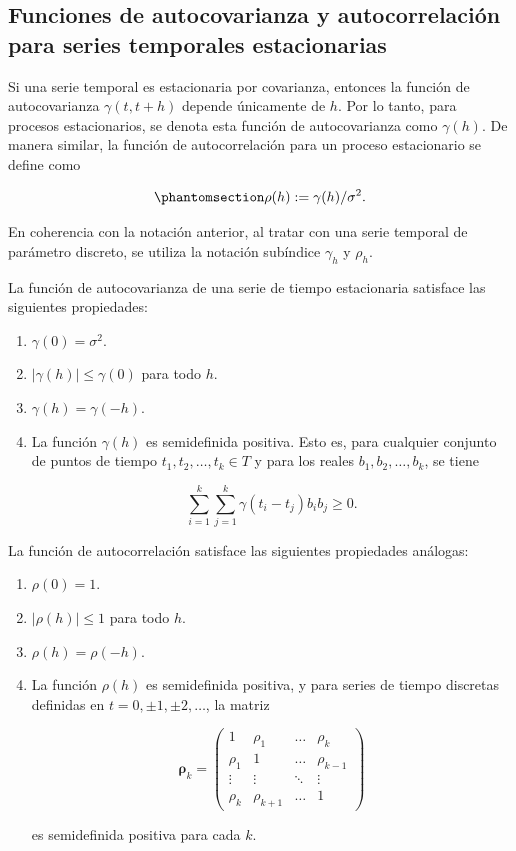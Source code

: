 \documentclass[
  letterpaper,
  DIV=11,
  numbers=noendperiod]{scrreport}
\theoremstyle{plain}
\theoremstyle{definition}
\theoremstyle{definition}
\theoremstyle{plain}
\theoremstyle{remark}
\begin{document}
\subsection{Funciones de autocovarianza y autocorrelación para series
temporales
estacionarias}\label{funciones-de-autocovarianza-y-autocorrelaciuxf3n-para-series-temporales-estacionarias}

Si una serie temporal es estacionaria por covarianza, entonces la
función de autocovarianza \(\gamma (t, t + h)\) depende únicamente de
\(h\). Por lo tanto, para procesos estacionarios, se denota esta función
de autocovarianza como \(\gamma(h)\). De manera similar, la función de
autocorrelación para un proceso estacionario se define como

\begin{equation}\phantomsection\label{eq-autocorrelacion}{
\rho(h):=\gamma(h)/\sigma^2.
}\end{equation}

En coherencia con la notación anterior, al tratar con una serie temporal
de parámetro discreto, se utiliza la notación subíndice \(\gamma_h\) y
\(\rho_h\).

La función de autocovarianza de una serie de tiempo estacionaria
satisface las siguientes propiedades:

\begin{enumerate}
\def\labelenumi{\roman{enumi}.}
\item
  \(\gamma(0)=\sigma^2\).
\item
  \(|\gamma(h)|\leq \gamma(0)\) para todo \(h\).
\item
  \(\gamma(h)=\gamma(-h)\).
\item
  La función \(\gamma(h)\) es semidefinida positiva. Esto es, para
  cualquier conjunto de puntos de tiempo \(t_1, t_2,\ldots,t_k\in T\) y
  para los reales \(b_1,b_2,\ldots, b_k\), se tiene

  \[\sum_{i=1}^k \sum_{j=1}^k \gamma(t_i-t_j)b_i b_j\geq 0.
  \]
\end{enumerate}

La función de autocorrelación satisface las siguientes propiedades
análogas:

\begin{enumerate}
\def\labelenumi{\roman{enumi}.}
\item
  \(\rho (0) = 1\).
\item
  \(|\rho (h)|\leq 1\) para todo \(h\).
\item
  \(\rho(h)=\rho(-h)\).
\item
  La función \(\rho (h)\) es semidefinida positiva, y para series de
  tiempo discretas definidas en \(t = 0, \pm 1, \pm 2,\ldots\), la
  matriz

  \[
  \boldsymbol{\rho}_k = \begin{pmatrix}1 & \rho_1 & \ldots & \rho_k\\
  \rho_1 & 1 & \ldots & \rho_{k-1}\\
  \vdots & \vdots & \ddots & \vdots\\
  \rho_k & \rho_{k+1}&\ldots & 1\end{pmatrix}
  \]

  es semidefinida positiva para cada \(k\).
\end{enumerate}
\end{document}
